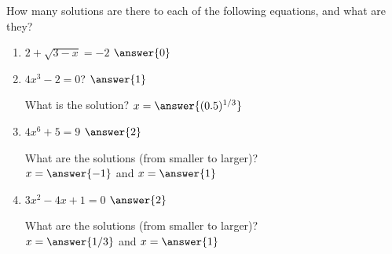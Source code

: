 \documentclass{ximera}
\author{Elizabeth Campolongo}
\begin{document}
\begin{exercise}
How many solutions are there to each of the following equations, and what are they?
\begin{enumerate}
\item $2+\sqrt{3-x}=-2$ $\answer{0}$
%
\item $4x^3-2=0$? $\answer{1}$
%
\begin{exercise}
What is the solution?
$x=\answer{(0.5)^{1/3}}$
\end{exercise}

\item $4x^6+5=9$ $\answer{2}$
\begin{exercise}
What are the solutions (from smaller to larger)?\\
$x=\answer{-1}$ and $x=\answer{1}$
\end{exercise}

\item $3x^2-4x+1=0$ $\answer{2}$
\begin{exercise}
What are the solutions (from smaller to larger)?\\
$x=\answer{1/3}$ and $x=\answer{1}$
\end{exercise}

\end{enumerate}
\end{exercise}
\end{document}
